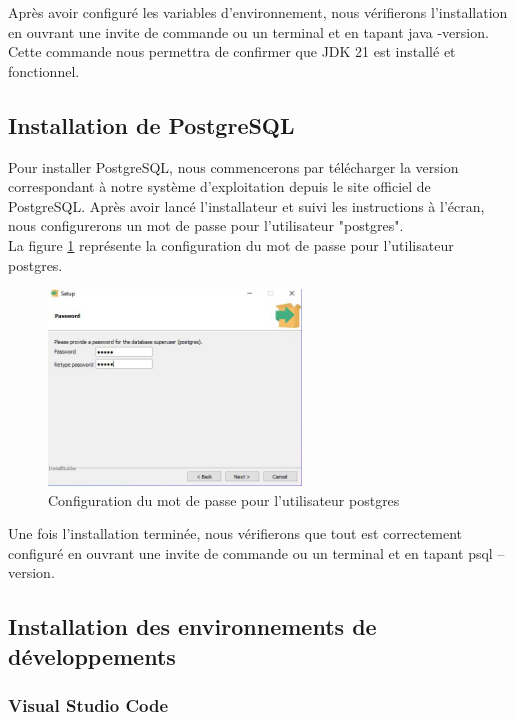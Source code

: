 \documentclass[12pt]{report}
\begin{document}
			Après avoir configuré les variables d'environnement, nous vérifierons l'installation en ouvrant une invite de commande ou un terminal et en tapant java -version. Cette commande nous permettra de confirmer que JDK 21 est installé et fonctionnel.

			\subsection{Installation de PostgreSQL}

			\hspace{15pt} Pour installer PostgreSQL, nous commencerons par télécharger la version correspondant à notre système d'exploitation depuis le site officiel de PostgreSQL. Après avoir lancé l'installateur et suivi les instructions à l'écran, nous configurerons un mot de passe pour l'utilisateur "postgres".\\

			La figure \ref{fig:postgreMDP} représente la  configuration du mot de passe pour l'utilisateur postgres.
			
			\begin{figure}[h]
				\centering
				\includegraphics[width=0.6\textwidth]{postgreMDP.jpg}
				\caption{Configuration du mot de passe pour l'utilisateur postgres}
				\label{fig:postgreMDP}
			\end{figure}
			\FloatBarrier
	
			Une fois l'installation terminée, nous vérifierons que tout est correctement configuré en ouvrant une invite de commande ou un terminal et en tapant psql --version.

			\subsection{Installation des environnements de développements}
			
			\subsubsection{Visual Studio Code}
\end{document}
